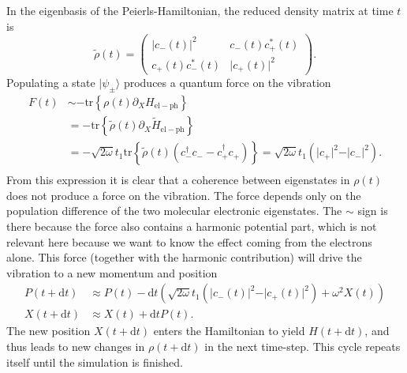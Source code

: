 \documentclass{article}
\newcommand{\dif}{\mathrm{d}}
\newcommand{\pdagger}{{\phantom{\dagger}}}
\newcommand{\tr}[1]{\mathrm{tr}\left\{#1\right\}}
\begin{document}
In the eigenbasis of the Peierls-Hamiltonian, the reduced density matrix at time $t$ is
\begin{equation}
	\tilde{\rho}(t) = \begin{pmatrix}
		\vert c_-(t)\vert^2 &  c_-^{\phantom{*}}(t)c_+^*(t) \\
		c_+^{\phantom{*}}(t)c_-^*(t) & \vert c_+(t)\vert^2 
	\end{pmatrix}.
\end{equation}
Populating a state $\vert\psi_\pm\rangle$ produces a quantum force on the vibration
\begin{align}
	F(t) &\sim -\tr{\rho(t)\partial_X H_\mathrm{el-ph}} \\
	&= -\tr{\tilde{\rho}(t)\partial_X \tilde{H}_\mathrm{el-ph}}\\
	&= -\sqrt{2\omega}t_1\tr{\tilde{\rho}(t) (c_-^\dagger c_-^\pdagger - c_+^\dagger c_+^\pdagger)} = \sqrt{2\omega}t_1 (\vert c_+\vert^2 - \vert c_-\vert^2).\\
\end{align}
From this expression it is clear that a coherence between eigenstates in $\rho(t)$ does not produce a force on the vibration. The force depends only on the population difference of the two molecular electronic eigenstates. The $\sim$ sign is there because the force also contains a harmonic potential part, which is not relevant here because we want to know the effect coming from the electrons alone. This force (together with the harmonic contribution) will drive the vibration to a new momentum and position
\begin{align*}
	P(t+\dif t) &\approx  P(t) - \dif t (\sqrt{2\omega}t_1(\vert c_-(t)\vert^2 - \vert c_+(t)\vert^2 ) + \omega^2 X(t)) \\
	X(t+\dif t) &\approx X(t) + \dif t P(t).
\end{align*}
The new position $X(t+\dif  t)$ enters the Hamiltonian to yield $H(t+\dif t)$, and thus leads to new changes in $\rho(t+\dif t)$ in the next time-step. This cycle repeats itself until the simulation is finished.
\end{document}
